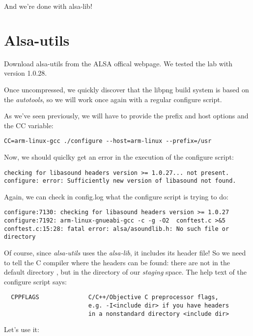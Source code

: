 And we're done with alsa-lib!

\section{Alsa-utils}

Download alsa-utils from the ALSA offical webpage. We tested the lab
with version 1.0.28.

Once uncompressed, we quickly discover that the libpng build system is
based on the {\em autotools}, so we will work once again with a
regular configure script.

As we've seen previously, we will have to provide the prefix and host
options and the CC variable:

\begin{verbatim}
CC=arm-linux-gcc ./configure --host=arm-linux --prefix=/usr
\end{verbatim}

Now, we should quiclky get an error in the execution of the configure
script:

\begin{verbatim}
checking for libasound headers version >= 1.0.27... not present.
configure: error: Sufficiently new version of libasound not found.
\end{verbatim}

Again, we can check in config.log what the configure script is trying
to do:

\footnotesize
\begin{verbatim}
configure:7130: checking for libasound headers version >= 1.0.27
configure:7192: arm-linux-gnueabi-gcc -c -g -O2  conftest.c >&5
conftest.c:15:28: fatal error: alsa/asoundlib.h: No such file or directory
\end{verbatim}
\normalsize

Of course, since {\em alsa-utils} uses the {\em alsa-lib}, it includes
its header file! So we need to tell the C compiler where the headers
can be found: there are not in the default directory
, but in the  directory of our
{\em staging} space. The help text of the configure script says:

\begin{verbatim}
  CPPFLAGS              C/C++/Objective C preprocessor flags,
                        e.g. -I<include dir> if you have headers
                        in a nonstandard directory <include dir>
\end{verbatim}

Let's use it:

